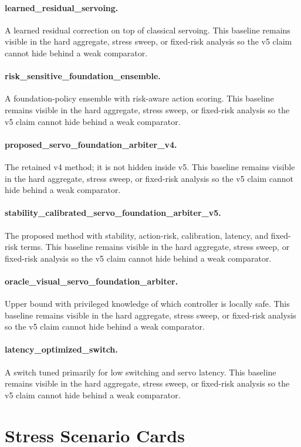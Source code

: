 \documentclass{article}
\begin{document}
\paragraph{learned\_residual\_servoing.} A learned residual correction on top of classical servoing.
This baseline remains visible in the hard aggregate, stress sweep, or fixed-risk analysis so the v5 claim cannot hide behind a weak comparator.
\paragraph{risk\_sensitive\_foundation\_ensemble.} A foundation-policy ensemble with risk-aware action scoring.
This baseline remains visible in the hard aggregate, stress sweep, or fixed-risk analysis so the v5 claim cannot hide behind a weak comparator.
\paragraph{proposed\_servo\_foundation\_arbiter\_v4.} The retained v4 method; it is not hidden inside v5.
This baseline remains visible in the hard aggregate, stress sweep, or fixed-risk analysis so the v5 claim cannot hide behind a weak comparator.
\paragraph{stability\_calibrated\_servo\_foundation\_arbiter\_v5.} The proposed method with stability, action-risk, calibration, latency, and fixed-risk terms.
This baseline remains visible in the hard aggregate, stress sweep, or fixed-risk analysis so the v5 claim cannot hide behind a weak comparator.
\paragraph{oracle\_visual\_servo\_foundation\_arbiter.} Upper bound with privileged knowledge of which controller is locally safe.
This baseline remains visible in the hard aggregate, stress sweep, or fixed-risk analysis so the v5 claim cannot hide behind a weak comparator.
\paragraph{latency\_optimized\_switch.} A switch tuned primarily for low switching and servo latency.
This baseline remains visible in the hard aggregate, stress sweep, or fixed-risk analysis so the v5 claim cannot hide behind a weak comparator.
\clearpage
\section{Stress Scenario Cards}
\end{document}
